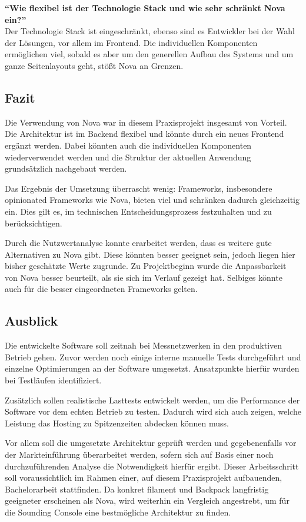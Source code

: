 \textbf{\enquote{Wie flexibel ist der Technologie Stack und wie sehr schränkt Nova ein?}}\\
Der Technologie Stack ist eingeschränkt, ebenso sind es Entwickler bei der Wahl der Lösungen, vor allem im Frontend.
Die individuellen Komponenten ermöglichen viel, sobald es aber um den generellen Aufbau des Systems und um ganze Seitenlayouts geht, stößt Nova an Grenzen.

\subsection{Fazit}
Die Verwendung von Nova war in diesem Praxisprojekt insgesamt von Vorteil.
Die Architektur ist im Backend flexibel und könnte durch ein neues Frontend ergänzt werden.
Dabei könnten auch die individuellen Komponenten wiederverwendet werden und die Struktur der aktuellen Anwendung grundsätzlich nachgebaut werden.

Das Ergebnis der Umsetzung überrascht wenig:
Frameworks, insbesondere opinionated Frameworks wie Nova, bieten viel und schränken dadurch gleichzeitig ein.
Dies gilt es, im technischen Entscheidungsprozess festzuhalten und zu berücksichtigen.

Durch die Nutzwertanalyse konnte erarbeitet werden, dass es weitere gute Alternativen zu Nova gibt.
Diese könnten besser geeignet sein, jedoch liegen hier bisher geschätzte Werte zugrunde.
Zu Projektbeginn wurde die Anpassbarkeit von Nova besser beurteilt, als sie sich im Verlauf gezeigt hat.
Selbiges könnte auch für die besser eingeordneten Frameworks gelten.

\subsection{Ausblick}
Die entwickelte Software soll zeitnah bei Messnetzwerken in den produktiven Betrieb gehen.
Zuvor werden noch einige interne manuelle Tests durchgeführt und einzelne Optimierungen an der Software umgesetzt.
Ansatzpunkte hierfür wurden bei Testläufen identifiziert.

Zusätzlich sollen realistische Lasttests entwickelt werden, um die Performance der Software vor dem echten Betrieb zu testen.
Dadurch wird sich auch zeigen, welche Leistung das Hosting zu Spitzenzeiten abdecken können muss.

Vor allem soll die umgesetzte Architektur geprüft werden und gegebenenfalls vor der Markteinführung überarbeitet werden, sofern sich auf Basis einer noch durchzuführenden Analyse die Notwendigkeit hierfür ergibt.
Dieser Arbeitsschritt soll voraussichtlich im Rahmen einer, auf diesem Praxisprojekt aufbauenden, Bachelorarbeit stattfinden.
Da konkret filament und Backpack langfristig geeigneter erscheinen als Nova, wird weiterhin ein Vergleich angestrebt, um für die Sounding Console eine bestmögliche Architektur zu finden.

